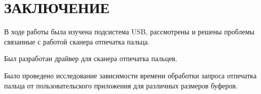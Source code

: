 \chapter*{ЗАКЛЮЧЕНИЕ}

В ходе работы была изучена подсистема USB, рассмотрены и решены проблемы связанные с работой сканера отпечатка пальца.

Был разработан драйвер для сканера отпечатка пальцев.

Было проведено исследование зависимости времени обработки запроса отпечатка пальца от пользовательского приложения для различных размеров буферов.
